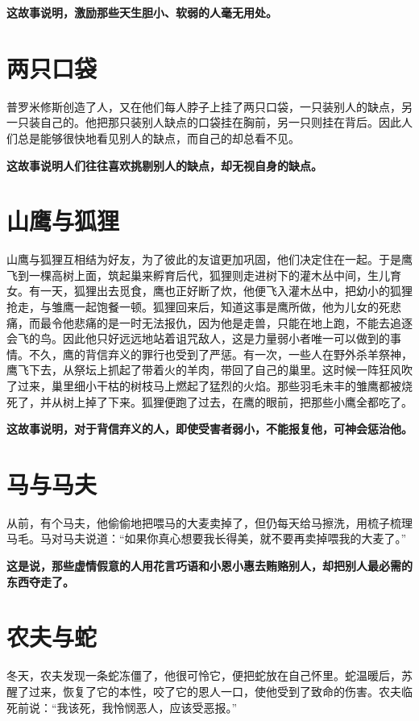 {\bfseries \color{red}这故事说明，激励那些天生胆小、软弱的人毫无用处。}

\section{两只口袋}

普罗米修斯创造了人，又在他们每人脖子上挂了两只口袋，一只装别人的缺点，另一只装自己的。他把那只装别人缺点的口袋挂在胸前，另一只则挂在背后。因此人们总是能够很快地看见别人的缺点，而自己的却总看不见。

{\bfseries \color{red}这故事说明人们往往喜欢挑剔别人的缺点，却无视自身的缺点。}

\section{山鹰与狐狸}

山鹰与狐狸互相结为好友，为了彼此的友谊更加巩固，他们决定住在一起。于是鹰飞到一棵高树上面，筑起巢来孵育后代，狐狸则走进树下的灌木丛中间，生儿育女。有一天，狐狸出去觅食，鹰也正好断了炊，他便飞入灌木丛中，把幼小的狐狸抢走，与雏鹰一起饱餐一顿。狐狸回来后，知道这事是鹰所做，他为儿女的死悲痛，而最令他悲痛的是一时无法报仇，因为他是走兽，只能在地上跑，不能去追逐会飞的鸟。因此他只好远远地站着诅咒敌人，这是力量弱小者唯一可以做到的事情。不久，鹰的背信弃义的罪行也受到了严惩。有一次，一些人在野外杀羊祭神，鹰飞下去，从祭坛上抓起了带着火的羊肉，带回了自己的巢里。这时候一阵狂风吹了过来，巢里细小干枯的树枝马上燃起了猛烈的火焰。那些羽毛未丰的雏鹰都被烧死了，并从树上掉了下来。狐狸便跑了过去，在鹰的眼前，把那些小鹰全都吃了。

{\bfseries \color{red}这故事说明，对于背信弃义的人，即使受害者弱小，不能报复他，可神会惩治他。}

\section{马与马夫}

从前，有个马夫，他偷偷地把喂马的大麦卖掉了，但仍每天给马擦洗，用梳子梳理马毛。马对马夫说道：“如果你真心想要我长得美，就不要再卖掉喂我的大麦了。”

{\bfseries \color{red}这是说，那些虚情假意的人用花言巧语和小恩小惠去贿赂别人，却把别人最必需的东西夺走了。}

\section{农夫与蛇}

冬天，农夫发现一条蛇冻僵了，他很可怜它，便把蛇放在自己怀里。蛇温暖后，苏醒了过来，恢复了它的本性，咬了它的恩人一口，使他受到了致命的伤害。农夫临死前说：“我该死，我怜悯恶人，应该受恶报。”

